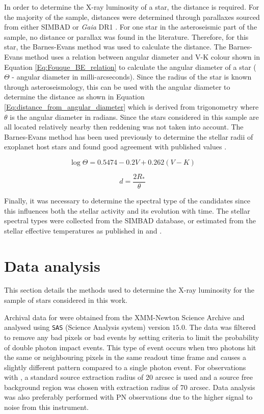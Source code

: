 In order to determine the X-ray luminosity of a star, the distance is required. For the majority of the sample, distances were determined through parallaxes sourced from either SIMBAD \citep{Wenger_etal_2000} or \textit{Gaia} DR1 \citep{Gaia_Collaboration_2016_DR1}. For one star in the asteroseismic part of the sample, no distance or parallax was found in the literature. Therefore, for this star, the Barnes-Evans method was used to calculate the distance. The Barnes-Evans method uses a relation between angular diameter and V-K colour \citep{Fouque_Gieren_1997} shown in Equation \ref{Eq:Fouque_BE_relation} to calculate the angular diameter of a star ($\Theta$ - angular diameter in milli-arcseconds). Since the radius of the star is known through asteroseismology, this can be used with the angular diameter to determine the distance as shown in Equation \ref{Eq:distance_from_angular_diameter} which is derived from trigonometry where $\theta$ is the angular diameter in radians. Since the stars considered in this sample are all located relatively nearby then reddening was not taken into account. The Barnes-Evans method has been used previously to determine the stellar radii of exoplanet host stars and found good agreement with published values \citep{Watson_etal_2010}.

\begin{equation}
    \log\Theta = 0.5474 - 0.2V + 0.262(V-K)
    \label{Eq:Fouque_BE_relation}
\end{equation}

\begin{equation}
    d = \frac{2R_{*}}{\theta}
    \label{Eq:distance_from_angular_diameter}
\end{equation}

Finally, it was necessary to determine the spectral type of the candidates since this influences both the stellar activity and its evolution with time. The stellar spectral types were collected from the SIMBAD \citep{Wenger_etal_2000} database, or estimated from the stellar effective temperatures as published in \citet{Chaplin_etal_2014} and \citet{Silva_Aguirre_etal_2015}.

\section{Data analysis}
This section details the methods used to determine the X-ray luminosity for the sample of stars considered in this work.

Archival data for \XMM were obtained from the XMM-Newton Science Archive and analysed using \texttt{SAS} (Science Analysis system) version $15.0$. The data was filtered to remove any bad pixels or bad events by setting criteria to limit the probability of double photon impact events. This type of event occurs when two photons hit the same or neighbouring pixels in the same readout time frame and causes a slightly different pattern compared to a single photon event. For observations with \XMM, a standard source extraction radius of 20 arcsec is used and a source free background region was chosen with extraction radius of 70 arcsec. Data analysis was also preferably performed with PN observations due to the higher signal to noise from this instrument.

